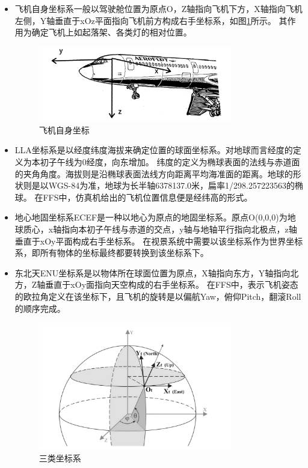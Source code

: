 \begin{itemize}
    \item [（1）]
    飞机自身坐标系一般以驾驶舱位置为原点O，Z轴指向飞机下方，X轴指向飞机左侧，Y轴垂直于xOz平面指向飞机前方构成右手坐标系，如图\ref{crood1}所示。
    其作用为确定飞机上如起落架、各类灯的相对位置\cite{crood4}。
    \begin{figure}[h!]
        \begin{center}
            \includegraphics[width=0.8\textwidth]{pictures/plane.png}
            \caption{飞机自身坐标}
            \label{crood1}
        \end{center}
    \end{figure}
    \item [（2）]
    LLA坐标系是以经度纬度海拔来确定位置的球面坐标系。对地球而言经度的定义为本初子午线为0经度，向东增加。
    纬度的定义为椭球表面的法线与赤道面的夹角角度。海拔则是沿椭球表面法线方向距离平均海准面的距离。地球的形状则是以WGS-84为准，地球为长半轴6378137.0米，扁率1/298.257223563的椭球\cite{crood1}。
    在FFS中，仿真机给出的飞机位置信息便是经纬高的形式。
    \item [（3）]
    地心地固坐标系ECEF是一种以地心为原点的地固坐标系。原点O(0,0,0)为地球质心，x轴指向本初子午线与赤道的交点，y轴与地轴平行指向北极点，z轴垂直于xOy平面构成右手坐标系\cite{crood2}。
    在视景系统中需要以该坐标系作为世界坐标系，即所有物体的坐标最终都要转换到该坐标系下。
    \item [（4）]
    东北天ENU坐标系是以物体所在球面位置为原点，X轴指向东方，Y轴指向北方，Z轴垂直于xOy面指向天空构成的右手坐标系\cite{crood3}。
    在FFS中，表示飞机姿态的欧拉角定义在该坐标下，且飞机的旋转是以偏航Yaw，俯仰Pitch，翻滚Roll的顺序完成。
    \begin{figure}[h!]
        \begin{center}
            \includegraphics[width=0.8\textwidth]{pictures/coord.png}
            \caption{三类坐标系}
            \label{crood2}
        \end{center}
    \end{figure}
\end{itemize}

